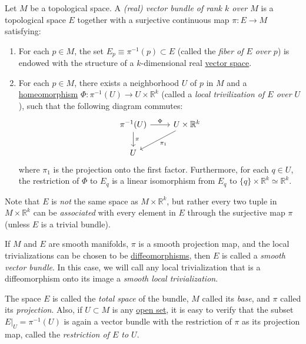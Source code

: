 \documentclass{article}
\newcounter{definition}[section]
\begin{document}
  \begin{definition}
    \label{def:real-vector-bundle-of-rank-k}
  Let $M$ be a topological space. A \textit{(real) vector bundle of rank $k$ over $M$} is a topological space $E$ together with a surjective continuous map $\pi: E \to M$ satisfying: 
  \begin{enumerate}
      \item For each $p \in M$, the set $E_p \equiv \pi^{-1} (p) \subset E$ (called the \textit{fiber of $E$ over $p$}) is endowed with the structure of a $k$-dimensional real \hyperref[lin-def:vector-space]{vector space}. 
      \item For each $p \in M$, there exists a neighborhood $U$ of $p$ in $M$ and a \hyperref[pst-def:homeomorphism]{homeomorphism} $\Phi: \pi^{-1}(U) \to U \times \mathbb{R}^k$ (called a \textit{local trivilization of $E$ over $U$}), such that the following diagram commutes: 
      \begin{equation}
        \begin{tikzcd}
              \pi^{-1}(U) \arrow{r}{\Phi} \arrow{d}{\pi}& U \times \mathbb{R}^k \arrow{ld}{\pi_1}\\
              U
              \end{tikzcd}
      \end{equation}
      where $\pi_1$ is the projection onto the first factor. Furthermore, for each $q \in U$, the restriction of $\Phi$ to $E_q$ is a linear isomorphism from $E_q$ to $\{q\} \times \mathbb{R}^k \simeq \mathbb{R}^k$. 
  \end{enumerate}
  \end{definition}

  Note that $E$ is \textit{not} the same space as $M \times \mathbb{R}^k$, but rather every two tuple in $M \times \mathbb{R}^k$ can be \textit{associated} with every element in $E$ through the surjective map $\pi$ (unless $E$ is a trivial bundle). 

  \begin{definition}
    \label{def:smooth-vector-bundle}
  If $M$ and $E$ are smooth manifolds, $\pi$ is a smooth projection map, and the local trivializations can be chosen to be \hyperref[def:diffeomorphism-2]{diffeomorphisms}, then $E$ is called a \textit{smooth vector bundle}. In this case, we will call any local trivialization that is a diffeomorphism onto its image a \textit{smooth local trivialization}. 

  The space $E$ is called the \textit{total space} of the bundle, $M$ called its \textit{base}, and $\pi$ called its \textit{projection}. Also, if $U \subset M$ is any \hyperref[pst-def:open-set]{open set}, it is easy to verify that the subset $E |_U = \pi^{-1} (U)$ is again a vector bundle with the restriction of $\pi$ as its projection map, called the \textit{restriction of $E$ to $U$}. 
  \end{definition}
\end{document}
